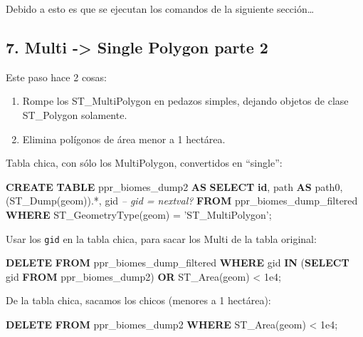 \documentclass[spanish,]{article}
\newenvironment{Shaded}{}{}
\newcommand{\KeywordTok}[1]{\textcolor[rgb]{0.00,0.44,0.13}{\textbf{{#1}}}}
\newcommand{\FloatTok}[1]{\textcolor[rgb]{0.25,0.63,0.44}{{#1}}}
\newcommand{\StringTok}[1]{\textcolor[rgb]{0.25,0.44,0.63}{{#1}}}
\newcommand{\CommentTok}[1]{\textcolor[rgb]{0.38,0.63,0.69}{\textit{{#1}}}}
\newcommand{\NormalTok}[1]{{#1}}
\providecommand{\tightlist}{%
  \setlength{\itemsep}{0pt}\setlength{\parskip}{0pt}}
\begin{document}
Debido a esto es que se ejecutan los comandos de la siguiente
sección\ldots{}

\subsection{7. Multi -\textgreater{} Single Polygon parte
2}\label{multi---single-polygon-parte-2}

Este paso hace 2 cosas:

\begin{enumerate}
\def\labelenumi{\arabic{enumi}.}
\tightlist
\item
  Rompe los ST\_MultiPolygon en pedazos simples, dejando objetos de
  clase ST\_Polygon solamente.
\item
  Elimina polígonos de área menor a 1 hectárea.
\end{enumerate}

Tabla chica, con sólo los MultiPolygon, convertidos en ``single'':

\begin{Shaded}
\begin{Highlighting}[]
\KeywordTok{CREATE} \KeywordTok{TABLE} \NormalTok{ppr_biomes_dump2 }\KeywordTok{AS}
\KeywordTok{SELECT} \KeywordTok{id}\NormalTok{, path }\KeywordTok{AS} \NormalTok{path0, (ST_Dump(geom)).*, gid }\CommentTok{-- gid = nextval?}
  \KeywordTok{FROM} \NormalTok{ppr_biomes_dump_filtered}
 \KeywordTok{WHERE} \NormalTok{ST_GeometryType(geom) = }\StringTok{'ST_MultiPolygon'}\NormalTok{;}
\end{Highlighting}
\end{Shaded}

Usar los \texttt{gid} en la tabla chica, para sacar los Multi de la
tabla original:

\begin{Shaded}
\begin{Highlighting}[]
\KeywordTok{DELETE} \KeywordTok{FROM} \NormalTok{ppr_biomes_dump_filtered }
 \KeywordTok{WHERE} \NormalTok{gid }\KeywordTok{IN} \NormalTok{(}\KeywordTok{SELECT} \NormalTok{gid }\KeywordTok{FROM} \NormalTok{ppr_biomes_dump2)}
    \KeywordTok{OR} \NormalTok{ST_Area(geom) < }\FloatTok{1e4}\NormalTok{;}
\end{Highlighting}
\end{Shaded}

De la tabla chica, sacamos los chicos (menores a 1 hectárea):

\begin{Shaded}
\begin{Highlighting}[]
\KeywordTok{DELETE} \KeywordTok{FROM} \NormalTok{ppr_biomes_dump2}
 \KeywordTok{WHERE} \NormalTok{ST_Area(geom) < }\FloatTok{1e4}\NormalTok{;}
\end{Highlighting}
\end{Shaded}
\end{document}
